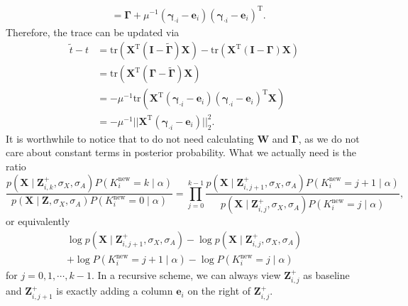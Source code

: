\documentclass{article}
\begin{document}
\begin{appendices}
\begin{equation}
\begin{aligned}
      &= \mathbf{\Gamma} + \mu^{-1}(\boldsymbol{\gamma}_{\cdot i} - \boldsymbol{e}_i)(\boldsymbol{\gamma}_{\cdot i} - \boldsymbol{e}_i)^\mathrm{T}.
      \label{eqn::gammaupdate}
    \end{aligned}
  \end{equation}
    Therefore, the trace can be updated via \begin{equation}
    \begin{aligned}
      \widetilde{t} - t &= \mathrm{tr}({\mathbf{X}}^{\mathrm{T}}(\mathbf{I} - \widetilde{\mathbf{\Gamma}})\mathbf{X}) - \mathrm{tr}({\mathbf{X}}^{\mathrm{T}}(\mathbf{I} - \mathbf{\Gamma})\mathbf{X}) \\
      &= \mathrm{tr}({\mathbf{X}}^{\mathrm{T}}(\mathbf{\Gamma} - \widetilde{\mathbf{\Gamma}})\mathbf{X}) \\
      &= -\mu^{-1}\mathrm{tr}({\mathbf{X}}^{\mathrm{T}}(\boldsymbol{\gamma}_{\cdot i} - \boldsymbol{e}_i)(\boldsymbol{\gamma}_{\cdot i} - \boldsymbol{e}_i)^\mathrm{T}\mathbf{X}) \\
      &= -\mu^{-1}||{\mathbf{X}}^{\mathrm{T}}(\boldsymbol{\gamma}_{\cdot i} - \boldsymbol{e}_i)||_2^2.
    \end{aligned}
  \end{equation}
    It is worthwhile to notice that to do not need calculating $\mathbf{W}$ and $\mathbf{\Gamma}$, as we do not care about constant terms in posterior probability. What we actually need is the ratio \begin{equation}\frac{p(\mathbf{X}\mid \mathbf{Z}_{i,k}^{+},\sigma_X,\sigma_A)P(K_i^\text{new} = k\mid\alpha)}{p(\mathbf{X}\mid \mathbf{Z},\sigma_X,\sigma_A)P(K_i^\text{new} = 0\mid\alpha)} = \prod_{j = 0}^{k-1} \frac{p(\mathbf{X}\mid \mathbf{Z}_{i,j+1}^{+},\sigma_X,\sigma_A)P(K_i^\text{new} = j+1\mid\alpha)}{p(\mathbf{X}\mid \mathbf{Z}_{i,j}^{+},\sigma_X,\sigma_A)P(K_i^\text{new} = j\mid\alpha)},\end{equation}
  or equivalently \begin{multline}\log p(\mathbf{X}\mid \mathbf{Z}_{i,j+1}^{+},\sigma_X,\sigma_A) - \log p(\mathbf{X}\mid \mathbf{Z}_{i,j}^{+},\sigma_X,\sigma_A) \\+ \log P(K_i^\text{new} = j+1\mid\alpha) - \log P(K_i^\text{new} = j\mid\alpha)
  \label{eqn::logdiff}
  \end{multline}
    for $j = 0, 1,\cdots, k-1$.
    In a recursive scheme, we can always view $\mathbf{Z}_{i,j}^+$ as baseline and $\mathbf{Z}_{i, j+1}^+$ is exactly adding a column $\boldsymbol{e}_i$ on the right of $\mathbf{Z}_{i,j}^+$.


\end{appendices}
\end{document}
